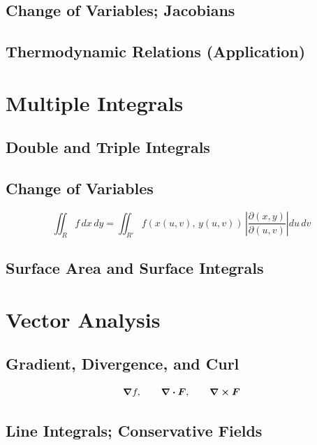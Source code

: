 \documentclass[11pt, letterpaper]{article}
\theoremstyle{plain}
\newcommand{\vv}[1]{\bm{#1}}
\begin{document}
\subsection{Change of Variables; Jacobians}

\subsection{Thermodynamic Relations (Application)}


\section{Multiple Integrals}              %

\subsection{Double and Triple Integrals}

\subsection{Change of Variables}
\[
  \iint_R f\,dx\,dy
  = \iint_{R'} f(x(u,v),\,y(u,v))\,\left|\frac{\partial(x,y)}{\partial(u,v)}\right|du\,dv
\]

\subsection{Surface Area and Surface Integrals}


\section{Vector Analysis}                 %

\subsection{Gradient, Divergence, and Curl}
\[
  \grad f, \qquad \div \vv{F}, \qquad \curl \vv{F}
\]

\subsection{Line Integrals; Conservative Fields}
\end{document}
